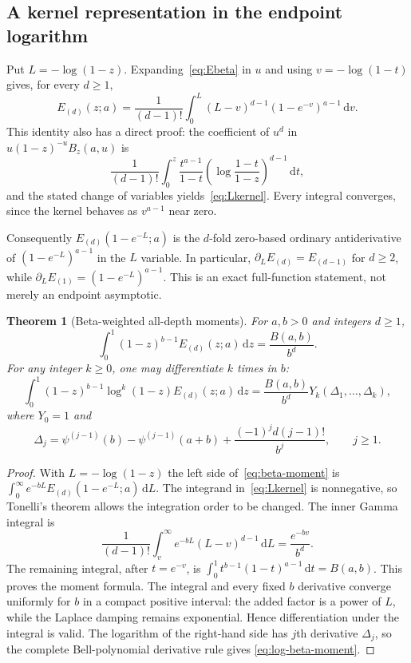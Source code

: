 \documentclass[11pt,oneside]{article}
\numberwithin{equation}{section}
\newtheorem{theorem}{Theorem}[section]
\theoremstyle{definition}
\theoremstyle{remark}
\newcommand{\dd}{\,\mathrm d}
\begin{document}
\subsection{A kernel representation in the endpoint logarithm}

Put $L=-\log(1-z)$. Expanding~\eqref{eq:Ebeta} in $u$ and using
$v=-\log(1-t)$ gives, for every $d\ge1$,
\begin{equation}\label{eq:Lkernel}
\boxed{\displaystyle
E_{(d)}(z;a)=\frac1{(d-1)!}
 \int_0^L(L-v)^{d-1}(1-e^{-v})^{a-1}\dd v.}
\end{equation}
This identity also has a direct proof: the coefficient of $u^d$ in
$u(1-z)^{-u}B_z(a,u)$ is
\[
\frac1{(d-1)!}\int_0^z\frac{t^{a-1}}{1-t}
 \left(\log\frac{1-t}{1-z}\right)^{d-1}\dd t,
\]
and the stated change of variables yields~\eqref{eq:Lkernel}. Every integral
converges, since the kernel behaves as $v^{a-1}$ near zero.

Consequently $E_{(d)}(1-e^{-L};a)$ is the $d$-fold zero-based ordinary
antiderivative of $(1-e^{-L})^{a-1}$ in the $L$ variable. In particular,
$\partial_LE_{(d)}=E_{(d-1)}$ for $d\ge2$, while
$\partial_LE_{(1)}=(1-e^{-L})^{a-1}$. This is an exact full-function statement,
not merely an endpoint asymptotic.

\begin{theorem}[Beta-weighted all-depth moments]\label{thm:beta-moments}
For $a,b>0$ and integers $d\ge1$,
\begin{equation}\label{eq:beta-moment}
\boxed{\displaystyle
\int_0^1(1-z)^{b-1}E_{(d)}(z;a)\dd z
=\frac{B(a,b)}{b^d}.}
\end{equation}
For any integer $k\ge0$, one may differentiate $k$ times in $b$:
\begin{equation}\label{eq:log-beta-moment}
\int_0^1(1-z)^{b-1}\log^k(1-z)E_{(d)}(z;a)\dd z
=\frac{B(a,b)}{b^d}Y_k(\Delta_1,\ldots,\Delta_k),
\end{equation}
where $Y_0=1$ and
\begin{equation}\label{eq:Delta}
\Delta_j=\psi^{(j-1)}(b)-\psi^{(j-1)}(a+b)
                  +\frac{(-1)^j d(j-1)!}{b^j},\qquad j\ge1.
\end{equation}
\end{theorem}

\begin{proof}
With $L=-\log(1-z)$ the left side of~\eqref{eq:beta-moment} is
$\int_0^\infty e^{-bL}E_{(d)}(1-e^{-L};a)\dd L$.
The integrand in~\eqref{eq:Lkernel} is nonnegative, so Tonelli's theorem
allows the integration order to be changed. The inner Gamma integral is
\[
\frac1{(d-1)!}\int_v^\infty e^{-bL}(L-v)^{d-1}\dd L
=\frac{e^{-bv}}{b^d}.
\]
The remaining integral, after $t=e^{-v}$, is
$\int_0^1t^{b-1}(1-t)^{a-1}\dd t=B(a,b)$. This proves the moment formula.
The integral and every fixed $b$ derivative converge uniformly for $b$ in a
compact positive interval: the added factor is a power of $L$, while the
Laplace damping remains exponential. Hence differentiation under the
integral is valid. The logarithm of the right-hand side has $j$th derivative
$\Delta_j$, so the complete Bell-polynomial derivative rule gives
\eqref{eq:log-beta-moment}.
\end{proof}
\end{document}
